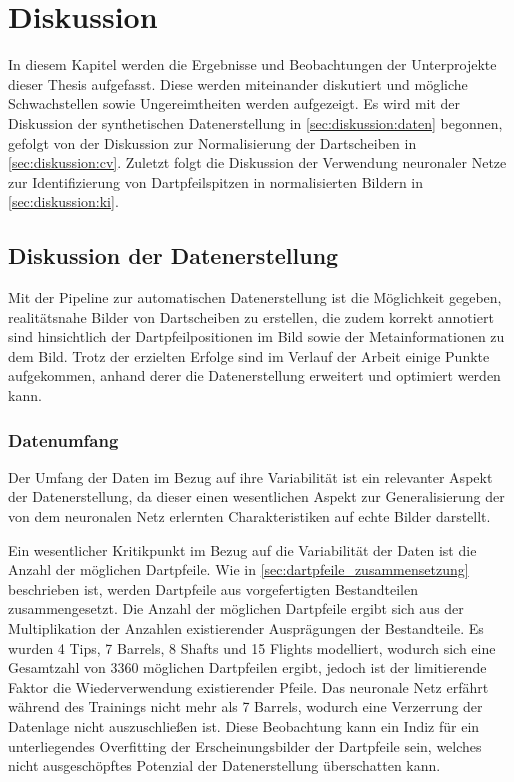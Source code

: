 
\chapter{Diskussion}
\label{cha:diskussion}

In diesem Kapitel werden die Ergebnisse und Beobachtungen der Unterprojekte dieser Thesis aufgefasst. Diese werden miteinander diskutiert und mögliche Schwachstellen sowie Ungereimtheiten werden aufgezeigt. Es wird mit der Diskussion der synthetischen Datenerstellung in \autoref{sec:diskussion:daten} begonnen, gefolgt von der Diskussion zur Normalisierung der Dartscheiben in \autoref{sec:diskussion:cv}. Zuletzt folgt die Diskussion der Verwendung neuronaler Netze zur Identifizierung von Dartpfeilspitzen in normalisierten Bildern in \autoref{sec:diskussion:ki}.


\section{Diskussion der Datenerstellung}
\label{sec:diskussion:daten}

Mit der Pipeline zur automatischen Datenerstellung ist die Möglichkeit gegeben, realitätsnahe Bilder von Dartscheiben zu erstellen, die zudem korrekt annotiert sind hinsichtlich der Dartpfeilpositionen im Bild sowie der Metainformationen zu dem Bild. Trotz der erzielten Erfolge sind im Verlauf der Arbeit einige Punkte aufgekommen, anhand derer die Datenerstellung erweitert und optimiert werden kann.

\subsection{Datenumfang}

Der Umfang der Daten im Bezug auf ihre Variabilität ist ein relevanter Aspekt der Datenerstellung, da dieser einen wesentlichen Aspekt zur Generalisierung der von dem neuronalen Netz erlernten Charakteristiken auf echte Bilder darstellt.

Ein wesentlicher Kritikpunkt im Bezug auf die Variabilität der Daten ist die Anzahl der möglichen Dartpfeile. Wie in \autoref{sec:dartpfeile_zusammensetzung} beschrieben ist, werden Dartpfeile aus vorgefertigten Bestandteilen zusammengesetzt. Die Anzahl der möglichen Dartpfeile ergibt sich aus der Multiplikation der Anzahlen existierender Ausprägungen der Bestandteile. Es wurden 4 Tips, 7 Barrels, 8 Shafts und 15 Flights modelliert, wodurch sich eine Gesamtzahl von $3360$ möglichen Dartpfeilen ergibt, jedoch ist der limitierende Faktor die Wiederverwendung existierender Pfeile. Das neuronale Netz erfährt während des Trainings nicht mehr als 7 Barrels, wodurch eine Verzerrung der Datenlage nicht auszuschließen ist. Diese Beobachtung kann ein Indiz für ein unterliegendes Overfitting der Erscheinungsbilder der Dartpfeile sein, welches nicht ausgeschöpftes Potenzial der Datenerstellung überschatten kann.

